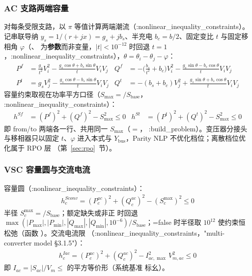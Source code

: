 \subsubsection*{AC 支路两端容量}
对每条受限支路，以 $\pi$ 等值计算两端潮流（:nonlinear\_inequality\_constraints）。记串联导纳
$y_s=1/(r+jx)=g_s+jb_s$、半充电 $b_c=b/2$、固定变比 $t$ 与固定移相角
$\varphi$（、 为\textbf{参数}而非变量，$|t|<10^{-12}$
时回退 $t=1$，:nonlinear\_inequality\_constraints），$\theta=\theta_i-\theta_j-\varphi$：
\begin{align*}
P^{f}&=\frac{g_s}{t^2}V_i^2-\frac{g_s\cos\theta+b_s\sin\theta}{t}V_iV_j
&Q^{f}&=-\Big(\frac{b_s}{t^2}+b_c\Big)V_i^2-\frac{g_s\sin\theta-b_s\cos\theta}{t}V_iV_j\\
P^{t}&=g_sV_j^2-\frac{g_s\cos\theta-b_s\sin\theta}{t}V_iV_j
&Q^{t}&=-(b_s+b_c)V_j^2+\frac{g_s\sin\theta+b_s\cos\theta}{t}V_iV_j
\end{align*}
容量约束取视在功率平方口径（$S_{\max}=$$/S_{\mathrm{base}}$，
:nonlinear\_inequality\_constraints）：
\begin{align*}
h^{Sf}&=(P^{f})^2+(Q^{f})^2-S_{\max}^2\le 0
&h^{St}&=(P^{t})^2+(Q^{t})^2-S_{\max}^2\le 0
\end{align*}
即 from/to 两端各一行、共用同一 $S_{\max}$（$=$，
:build\_problem）。变压器分接头与移相器只以固定 $t$、$\varphi$ 进入本式与
$Y_{\mathrm{bus}}$，Parity NLP 不优化档位；离散档位优化属于 RPO 层
（第~\ref{sec:rpo}~节）。

\subsubsection*{VSC 容量圆与交流电流}
容量圆（:nonlinear\_inequality\_constraints）：
\begin{align*}
h^{Sconv}_c=(P^{ac}_c)^2+(Q^{ac}_c)^2-(S^{\max}_c)^2\le 0
\end{align*}
半径 $S^{\max}_c=$$/S_{\mathrm{base}}$；额定缺失或非正
时回退 $\max(|P_{\max}|,|P_{\min}|,|Q_{\max}|,|Q_{\min}|,10^{-6})/
S_{\mathrm{base}}$；=false 时半径取
$10^{12}$ 使约束恒松弛（函数 ）。交流电流限
（:nonlinear\_inequality\_constraints，"multi-converter model §3.1.5"）：
\begin{align*}
h^{Iac}_c=(P^{ac}_c)^2+(Q^{ac}_c)^2-I^{2}_{ac,\max}\,V_{m,ac}^2\le 0
\end{align*}
即 $I_{ac}=|S_{ac}|/V_m\le$ 的平方等价形（系统基准
标幺）。

